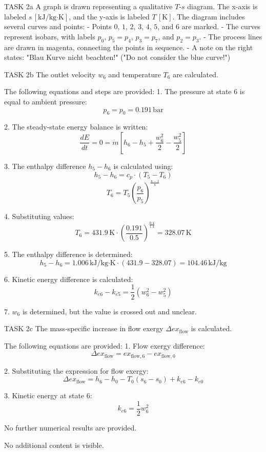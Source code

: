 TASK 2a  
A graph is drawn representing a qualitative \( T \)-\( s \) diagram. The x-axis is labeled \( s \, [\text{kJ/kg·K}] \), and the y-axis is labeled \( T \, [\text{K}] \). The diagram includes several curves and points:  
- Points \( 0 \), \( 1 \), \( 2 \), \( 3 \), \( 4 \), \( 5 \), and \( 6 \) are marked.  
- The curves represent isobars, with labels \( p_0 \), \( p_5 = p_4 \), \( p_3 = p_7 \), and \( p_2 = p_3 \).  
- The process lines are drawn in magenta, connecting the points in sequence.  
- A note on the right states: "Blau Kurve nicht beachten!" ("Do not consider the blue curve!")  

TASK 2b  
The outlet velocity \( w_6 \) and temperature \( T_6 \) are calculated.  

The following equations and steps are provided:  
1. The pressure at state 6 is equal to ambient pressure:  
   \[
   p_6 = p_0 = 0.191 \, \text{bar}
   \]  

2. The steady-state energy balance is written:  
   \[
   \frac{dE}{dt} = 0 = \dot{m} \left[ h_6 - h_5 + \frac{w_6^2}{2} - \frac{w_5^2}{2} \right]
   \]  

3. The enthalpy difference \( h_5 - h_6 \) is calculated using:  
   \[
   h_5 - h_6 = c_p \cdot (T_5 - T_6)
   \]  
   \[
   T_6 = T_5 \left( \frac{p_6}{p_5} \right)^{\frac{\kappa - 1}{\kappa}}
   \]  

4. Substituting values:  
   \[
   T_6 = 431.9 \, \text{K} \cdot \left( \frac{0.191}{0.5} \right)^{\frac{0.4}{1.4}} = 328.07 \, \text{K}
   \]  

5. The enthalpy difference is determined:  
   \[
   h_5 - h_6 = 1.006 \, \text{kJ/kg·K} \cdot (431.9 - 328.07) = 104.46 \, \text{kJ/kg}
   \]  

6. Kinetic energy difference is calculated:  
   \[
   k_{e6} - k_{e5} = \frac{1}{2} \left( w_6^2 - w_5^2 \right)
   \]  

7. \( w_6 \) is determined, but the value is crossed out and unclear.  

TASK 2c  
The mass-specific increase in flow exergy \( \Delta ex_{\text{flow}} \) is calculated.  

The following equations are provided:  
1. Flow exergy difference:  
   \[
   \Delta ex_{\text{flow}} = ex_{\text{flow},6} - ex_{\text{flow},0}
   \]  

2. Substituting the expression for flow exergy:  
   \[
   \Delta ex_{\text{flow}} = h_6 - h_0 - T_0 (s_6 - s_0) + k_{e6} - k_{e0}
   \]  

3. Kinetic energy at state 6:  
   \[
   k_{e6} = \frac{1}{2} w_6^2
   \]  

No further numerical results are provided.  

No additional content is visible.